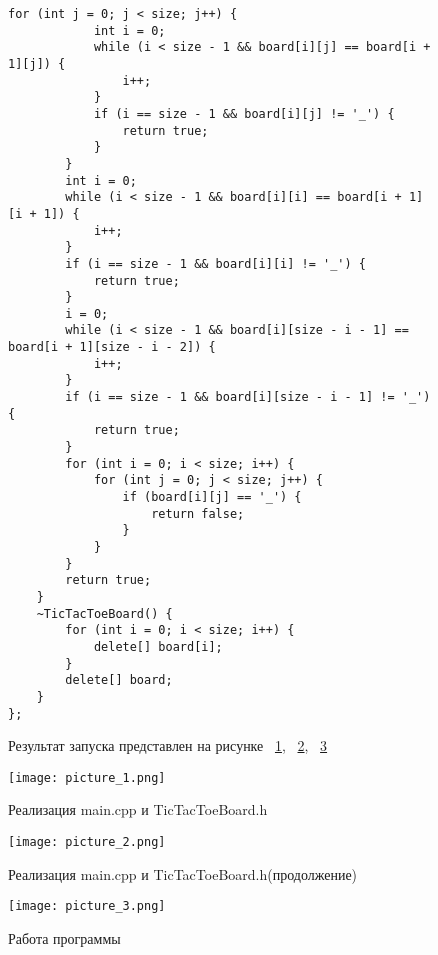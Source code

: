 \documentclass[a4paper, 14pt]{extarticle}
\begin{document}
\begin{figure}[!htb]
\begin{lstlisting}[language={},caption={класс TicTacToeBoard(продолжение)},label={lst:code3}]
        for (int j = 0; j < size; j++) {
            int i = 0;
            while (i < size - 1 && board[i][j] == board[i + 1][j]) {
                i++;
            }
            if (i == size - 1 && board[i][j] != '_') {
                return true;
            }
        }
        int i = 0;
        while (i < size - 1 && board[i][i] == board[i + 1][i + 1]) {
            i++;
        }
        if (i == size - 1 && board[i][i] != '_') {
            return true;
        }
        i = 0;
        while (i < size - 1 && board[i][size - i - 1] == board[i + 1][size - i - 2]) {
            i++;
        }
        if (i == size - 1 && board[i][size - i - 1] != '_') {
            return true;
        }
        for (int i = 0; i < size; i++) {
            for (int j = 0; j < size; j++) {
                if (board[i][j] == '_') {
                    return false;
                }
            }
        }
        return true;
    }
    ~TicTacToeBoard() {
        for (int i = 0; i < size; i++) {
            delete[] board[i];
        }
        delete[] board;
    }
};
\end{lstlisting}
\end{figure}

\begin{figure}[!htb]
Результат запуска представлен на рисунке ~\ref{fig:picture_1.png}, ~\ref{fig:picture_2.png}, ~\ref{fig:picture_3.png}
\end{figure}

\begin{figure}[!htb]
	\centering
	\texttt{[image: picture\_1.png]}
\caption{Реализация main.cpp и TicTacToeBoard.h}
\label{fig:picture_1.png}
\end{figure}

\begin{figure}[!htb]
	\centering
	\texttt{[image: picture\_2.png]}
\caption{Реализация main.cpp и TicTacToeBoard.h(продолжение)}
\label{fig:picture_2.png}
\end{figure}

\begin{figure}[!htb]
	\centering
	\texttt{[image: picture\_3.png]}
\caption{Работа программы}
\label{fig:picture_3.png}
\end{figure}
\end{document}
